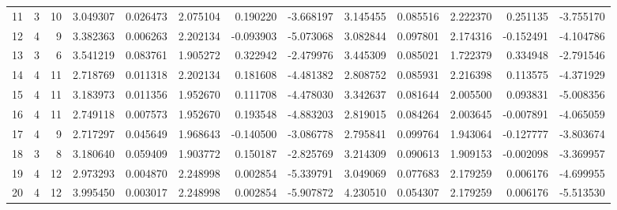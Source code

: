 \begin{tabular}{lrrrrrrrrrrrr}
11    &       3 &         10 &    3.049307 &    0.026473 &   2.075104 &   0.190220 &       -3.668197 &   3.145455 &   0.085516 &  2.222370 &  0.251135 &      -3.755170 \\
12    &       4 &          9 &    3.382363 &    0.006263 &   2.202134 &  -0.093903 &       -5.073068 &   3.082844 &   0.097801 &  2.174316 & -0.152491 &      -4.104786 \\
13    &       3 &          6 &    3.541219 &    0.083761 &   1.905272 &   0.322942 &       -2.479976 &   3.445309 &   0.085021 &  1.722379 &  0.334948 &      -2.791546 \\
14    &       4 &         11 &    2.718769 &    0.011318 &   2.202134 &   0.181608 &       -4.481382 &   2.808752 &   0.085931 &  2.216398 &  0.113575 &      -4.371929 \\
15    &       4 &         11 &    3.183973 &    0.011356 &   1.952670 &   0.111708 &       -4.478030 &   3.342637 &   0.081644 &  2.005500 &  0.093831 &      -5.008356 \\
16    &       4 &         11 &    2.749118 &    0.007573 &   1.952670 &   0.193548 &       -4.883203 &   2.819015 &   0.084264 &  2.003645 & -0.007891 &      -4.065059 \\
17    &       4 &          9 &    2.717297 &    0.045649 &   1.968643 &  -0.140500 &       -3.086778 &   2.795841 &   0.099764 &  1.943064 & -0.127777 &      -3.803674 \\
18    &       3 &          8 &    3.180640 &    0.059409 &   1.903772 &   0.150187 &       -2.825769 &   3.214309 &   0.090613 &  1.909153 & -0.002098 &      -3.369957 \\
19    &       4 &         12 &    2.973293 &    0.004870 &   2.248998 &   0.002854 &       -5.339791 &   3.049069 &   0.077683 &  2.179259 &  0.006176 &      -4.699955 \\
20    &       4 &         12 &    3.995450 &    0.003017 &   2.248998 &   0.002854 &       -5.907872 &   4.230510 &   0.054307 &  2.179259 &  0.006176 &      -5.513530 \\
\bottomrule
\end{tabular}
